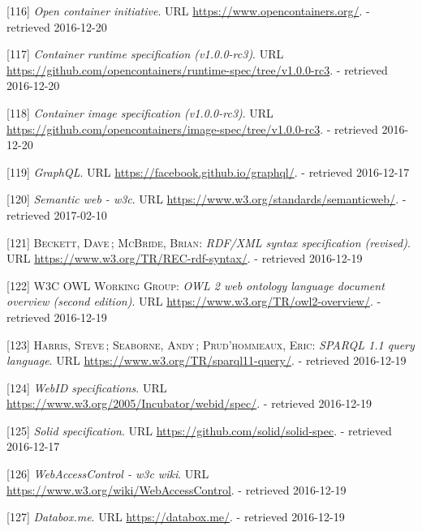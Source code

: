\documentclass[12pt,english,a4paper,titlepage,cleardoublepage=empty,dottedtoc]{report}
\begin{document}
\hypertarget{ref-web_2016_open-container-initiative}{}
{[}116{]} \emph{Open container initiative}. URL
\url{https://www.opencontainers.org/}. - retrieved 2016-12-20

\hypertarget{ref-web_oci-spec_runtime}{}
{[}117{]} \emph{Container runtime specification (v1.0.0-rc3)}. URL
\url{https://github.com/opencontainers/runtime-spec/tree/v1.0.0-rc3}. -
retrieved 2016-12-20

\hypertarget{ref-web_oci-spec_image}{}
{[}118{]} \emph{Container image specification (v1.0.0-rc3)}. URL
\url{https://github.com/opencontainers/image-spec/tree/v1.0.0-rc3}. -
retrieved 2016-12-20

\hypertarget{ref-web_spec_graphql}{}
{[}119{]} \emph{GraphQL}. URL \url{https://facebook.github.io/graphql/}.
- retrieved 2016-12-17

\hypertarget{ref-web_2016_w3c_semantic-web-activity}{}
{[}120{]} \emph{Semantic web - w3c}. URL
\url{https://www.w3.org/standards/semanticweb/}. - retrieved 2017-02-10

\hypertarget{ref-web_w3c-tr_rdf}{}
{[}121{]} \textsc{Beckett, Dave}\,; \textsc{McBride, Brian}:
\emph{RDF/XML syntax specification (revised)}. URL
\url{https://www.w3.org/TR/REC-rdf-syntax/}. - retrieved 2016-12-19

\hypertarget{ref-web_w3c-tr_owl}{}
{[}122{]} \textsc{W3C OWL Working Group}: \emph{OWL 2 web ontology
language document overview (second edition)}. URL
\url{https://www.w3.org/TR/owl2-overview/}. - retrieved 2016-12-19

\hypertarget{ref-web_w3c-tr_sparql}{}
{[}123{]} \textsc{Harris, Steve}\,; \textsc{Seaborne, Andy}\,;
\textsc{Prud'hommeaux, Eric}: \emph{SPARQL 1.1 query language}. URL
\url{https://www.w3.org/TR/sparql11-query/}. - retrieved 2016-12-19

\hypertarget{ref-web_w3c-draft_webid}{}
{[}124{]} \emph{WebID specifications}. URL
\url{https://www.w3.org/2005/Incubator/webid/spec/}. - retrieved
2016-12-19

\hypertarget{ref-web_spec_solid}{}
{[}125{]} \emph{Solid specification}. URL
\url{https://github.com/solid/solid-spec}. - retrieved 2016-12-17

\hypertarget{ref-web_2016_wiki_webaccesscontrol}{}
{[}126{]} \emph{WebAccessControl - w3c wiki}. URL
\url{https://www.w3.org/wiki/WebAccessControl}. - retrieved 2016-12-19

\hypertarget{ref-web_2016_demo_databox}{}
{[}127{]} \emph{Databox.me}. URL \url{https://databox.me/}. - retrieved
2016-12-19
\end{document}

